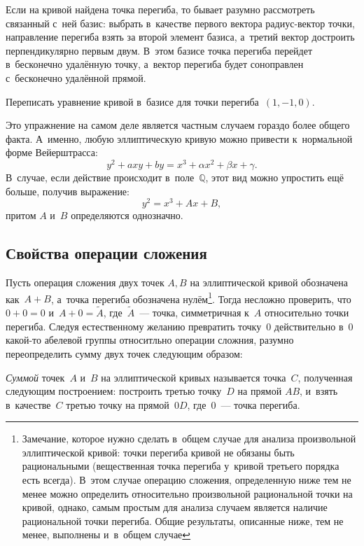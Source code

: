 \documentclass{article}
\begin{document}
Если на кривой найдена точка перегиба, то бывает разумно рассмотреть
связанный с~ней базис: выбрать в~качестве первого вектора радиус-вектор точки,
направление перегиба взять за второй элемент базиса, а~третий вектор достроить
перпендикулярно первым двум. В~этом базисе точка перегиба перейдет в~бесконечно
удалённую точку, а~вектор перегиба будет соноправлен с~бесконечно удалённой
прямой.

\begin{exercise}
  Переписать уравнение кривой в~базисе для точки перегиба~$(1, -1, 0)$.
\end{exercise}

Это упражнение на самом деле является частным случаем гораздо более общего
факта. А~именно, любую эллиптическую кривую можно привести
к~нормальной форме Вейерштрасса:
$$y^2 + axy + by = x^3 + \alpha x^2 + \beta x + \gamma.$$
В~случае, если действие происходит в~поле~$\mathbb{Q}$, этот вид
можно упростить ещё больше, получив выражение: $$y^2 = x^3 + Ax + B,$$
притом $A$ и~$B$ определяются однозначно.

\subsection{Свойства операции сложения}

Пусть операция сложения двух точек $A, B$ на эллиптической кривой обозначена
как~$A + B$, а~точка перегиба обозначена нулём\footnote{Замечание, которое
нужно сделать в~общем случае для анализа произвольной эллиптической кривой:
точки перегиба кривой не обязаны быть рациональными (вещественная точка
перегиба у~кривой третьего порядка есть всегда). В~этом случае операцию
сложения, определенную ниже тем не менее можно определить относительно
произвольной рациональной точки на кривой, однако, самым простым для анализа
случаем является наличие рациональной точки перегиба. Общие результаты,
описанные ниже, тем не менее, выполнены и~в~общем случае}.
Тогда несложно проверить, что~$0 + 0 = 0$ и~$A + 0 = \widetilde{A}$,
где~$\widetilde{A}$~--- точка, симметричная к~$A$ относительно точки перегиба.
Следуя естественному желанию превратить точку~0 действительно в~0 какой-то
абелевой группы относитльно операции сложния, разумно переопределить сумму двух
точек следующим образом:
\begin{definition}
  \emph{Суммой} точек~$A$ и~$B$ на эллиптической кривых называется точка~$C$,
  полученная следующим построением: построить третью точку~$D$ на прямой $AB$,
  и~взять в~качестве~$C$ третью точку на прямой~$0D$, где~$0$~--- точка
  перегиба.
\end{definition}
\end{document}
